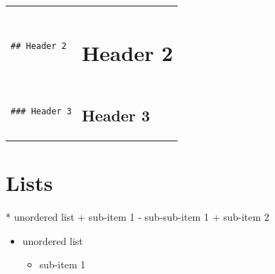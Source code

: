 \documentclass[
  letterpaper,
  DIV=11,
  numbers=noendperiod,
  oneside]{scrreprt}
\newenvironment{Shaded}{\begin{snugshade}}{\end{snugshade}}
\newcommand{\NormalTok}[1]{\textcolor[rgb]{0.00,0.23,0.31}{#1}}
\newcommand{\SpecialStringTok}[1]{\textcolor[rgb]{0.13,0.47,0.30}{#1}}
\providecommand{\tightlist}{%
  \setlength{\itemsep}{0pt}\setlength{\parskip}{0pt}}
\begin{document}
\begin{tcolorbox}
{\begin{longtable}[]{@{}
  >{\raggedright\arraybackslash}p{}
  >{\raggedright\arraybackslash}p{}@{}}
\begin{minipage}[t]{\linewidth}
\markboth{Header 1}{Header 1}
\end{minipage} \\
\begin{minipage}[t]{\linewidth}\raggedright
\begin{verbatim}
## Header 2
\end{verbatim}
\end{minipage} & \begin{minipage}[t]{\linewidth}\raggedright
\section*{Header 2}\label{header-2}
\addcontentsline{toc}{section}{Header 2}

\markright{Header 2}
\end{minipage} \\
\begin{minipage}[t]{\linewidth}\raggedright
\begin{verbatim}
### Header 3
\end{verbatim}
\end{minipage} & \begin{minipage}[t]{\linewidth}\raggedright
\subsection*{Header 3}\label{header-3}
\addcontentsline{toc}{subsection}{Header 3}
\end{minipage} \\
\end{longtable}
}

\section{Lists}\label{lists}

\begin{Shaded}
\begin{Highlighting}[]
\SpecialStringTok{* }\NormalTok{unordered list}
\SpecialStringTok{  + }\NormalTok{sub{-}item 1}
\SpecialStringTok{    {-} }\NormalTok{sub{-}sub{-}item 1}
\SpecialStringTok{  + }\NormalTok{sub{-}item 2}
\end{Highlighting}
\end{Shaded}

\begin{itemize}
\tightlist
\item
  unordered list

  \begin{itemize}
  \tightlist
  \item
    sub-item 1


\end{itemize}
\end{itemize}
\end{tcolorbox}
\end{document}
